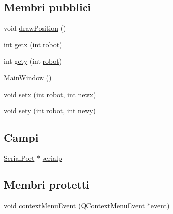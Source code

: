 \subsection*{Membri pubblici}
\begin{CompactItemize}
\item 
void \hyperlink{classMainWindow_772ba2e39bd737fa1fb38507c55b6acb}{draw\-Position} ()
\item 
int \hyperlink{classMainWindow_ff0645ac68ad121ee2d70f8f989dca42}{getx} (int \hyperlink{mainwindow_8cpp_ebf8093f61c93230d92191726d5bc846}{robot})
\item 
int \hyperlink{classMainWindow_031e0654d92e39b23d56749657a05d05}{gety} (int \hyperlink{mainwindow_8cpp_ebf8093f61c93230d92191726d5bc846}{robot})
\item 
\hyperlink{classMainWindow_eb676574b78bda84d687fdcfd65d84a6}{Main\-Window} ()
\item 
void \hyperlink{classMainWindow_06a4601d7b3cecfb4432f48e067ac81d}{setx} (int \hyperlink{mainwindow_8cpp_ebf8093f61c93230d92191726d5bc846}{robot}, int newx)
\item 
void \hyperlink{classMainWindow_5ee21538a4cacfcb64a9b504729f2026}{sety} (int \hyperlink{mainwindow_8cpp_ebf8093f61c93230d92191726d5bc846}{robot}, int newy)
\end{CompactItemize}
\subsection*{Campi}
\begin{CompactItemize}
\item 
\hyperlink{classSerialPort}{Serial\-Port} $\ast$ \hyperlink{classMainWindow_730a1b78e42ee50b10b26f34e4bf8b1e}{serialp}
\end{CompactItemize}
\subsection*{Membri protetti}
\begin{CompactItemize}
\item 
void \hyperlink{classMainWindow_59701ebb47f7e2f55977543b6293ba47}{context\-Menu\-Event} (QContext\-Menu\-Event $\ast$event)
\end{CompactItemize}
